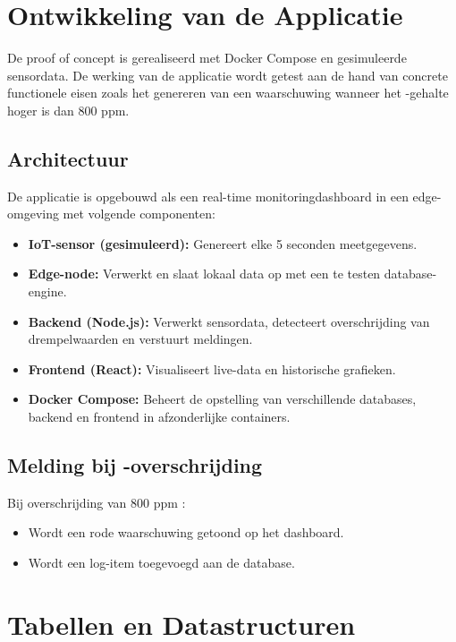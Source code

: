 \section{Ontwikkeling van de Applicatie}

De proof of concept is gerealiseerd met Docker Compose en gesimuleerde sensordata. De werking van de applicatie wordt getest aan de hand van concrete functionele eisen zoals het genereren van een waarschuwing wanneer het -gehalte hoger is dan 800 ppm.

\subsection{Architectuur}

De applicatie is opgebouwd als een real-time monitoringdashboard in een edge-omgeving met volgende componenten:

\begin{itemize}
    \item \textbf{IoT-sensor (gesimuleerd):} Genereert elke 5 seconden meetgegevens.
    \item \textbf{Edge-node:} Verwerkt en slaat lokaal data op met een te testen database-engine.
    \item \textbf{Backend (Node.js):} Verwerkt sensordata, detecteert overschrijding van drempelwaarden en verstuurt meldingen.
    \item \textbf{Frontend (React):} Visualiseert live-data en historische grafieken.
    \item \textbf{Docker Compose:} Beheert de opstelling van verschillende databases, backend en frontend in afzonderlijke containers.
\end{itemize}

\subsection{Melding bij -overschrijding}

Bij overschrijding van 800 ppm :
\begin{itemize}
    \item Wordt een rode waarschuwing getoond op het dashboard.
    \item Wordt een log-item toegevoegd aan de database.
\end{itemize}

\section{Tabellen en Datastructuren}

